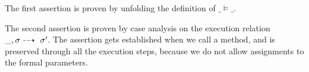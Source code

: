 %
%
%
%
% 
% 
% 
% 
%

 
{The first assertion is proven by unfolding the definition of $\_ \models \_ $.

The second assertion is proven by case analysis on the execution relation $\_, \sigma \dashrightarrow\ \sigma'$. 
The assertion gets established when we call a method, and is preserved through all the execution steps, because we do not allow assignments to the formal parameters.
 
}
\completeProof


